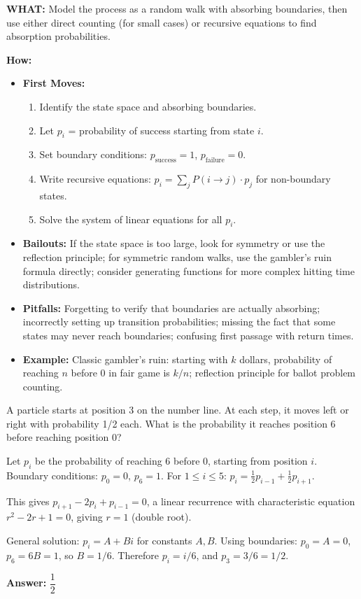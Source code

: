 \documentclass[12pt]{article}
\newenvironment{problem}[1]
{\begin{tcolorbox}[colback=blue!5!white,colframe=blue!75!black,title={#1}]}{\end{tcolorbox}}
\newenvironment{solution}
{\begin{tcolorbox}[colback=green!5!white,colframe=green!75!black,title={Solution}]}{\end{tcolorbox}}
\begin{document}
\textbf{WHAT:} Model the process as a random walk with absorbing boundaries, then use either direct counting (for small cases) or recursive equations to find absorption probabilities.

\textbf{How:}
\begin{itemize}
    \item \textbf{First Moves:}
    \begin{enumerate}[nosep]
        \item Identify the state space and absorbing boundaries.
        \item Let $p_i$ = probability of success starting from state $i$.
        \item Set boundary conditions: $p_{\text{success}} = 1$, $p_{\text{failure}} = 0$.
        \item Write recursive equations: $p_i = \sum_j P(i \to j) \cdot p_j$ for non-boundary states.
        \item Solve the system of linear equations for all $p_i$.
    \end{enumerate}
    \item \textbf{Bailouts:} If the state space is too large, look for symmetry or use the reflection principle; for symmetric random walks, use the gambler's ruin formula directly; consider generating functions for more complex hitting time distributions.
    \item \textbf{Pitfalls:} Forgetting to verify that boundaries are actually absorbing; incorrectly setting up transition probabilities; missing the fact that some states may never reach boundaries; confusing first passage with return times.
    \item \textbf{Example:} Classic gambler's ruin: starting with $k$ dollars, probability of reaching $n$ before $0$ in fair game is $k/n$; reflection principle for ballot problem counting.
\end{itemize}

\begin{problem}{Example: Simple Random Walk}
A particle starts at position 3 on the number line. At each step, it moves left or right with probability 1/2 each. What is the probability it reaches position 6 before reaching position 0?
\end{problem}

\begin{solution}
Let $p_i$ be the probability of reaching 6 before 0, starting from position $i$.
Boundary conditions: $p_0 = 0$, $p_6 = 1$.
For $1 \le i \le 5$: $p_i = \frac{1}{2}p_{i-1} + \frac{1}{2}p_{i+1}$.

This gives $p_{i+1} - 2p_i + p_{i-1} = 0$, a linear recurrence with characteristic equation $r^2 - 2r + 1 = 0$, giving $r = 1$ (double root).

General solution: $p_i = A + Bi$ for constants $A, B$.
Using boundaries: $p_0 = A = 0$, $p_6 = 6B = 1$, so $B = 1/6$.
Therefore $p_i = i/6$, and $p_3 = 3/6 = 1/2$.

\textbf{Answer:} $\dfrac{1}{2}$
\end{solution}
\end{document}
